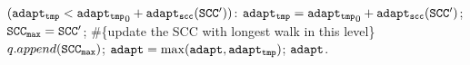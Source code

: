 \begin{algorithm}
\begin{algorithmic}[1]
    \STATE \qquad \qquad {} $(\mathtt{adapt_{tmp}} < \mathtt{adapt_{tmp}}_0 + \mathtt{adapt_{scc}(SCC')})$:
    \STATE \qquad \qquad \qquad \qquad $\mathtt{adapt_{tmp}} = \mathtt{adapt_{tmp}}_0 + \mathtt{adapt_{scc}(SCC')}$; 
    \STATE \qquad \qquad \qquad \qquad $\mathtt{SCC_{max} = SCC'} $; \#\{update the SCC with longest walk in this level\} 
    \STATE \qquad \qquad \qquad $q.append(\mathtt{SCC_{max}})$;
    \STATE \qquad $\mathtt{adapt} = \max(\mathtt{adapt}, \mathtt{adapt_{tmp}})$;    
    \RETURN $\mathtt{adapt}$.
    \end{algorithmic}
    \end{algorithm}
